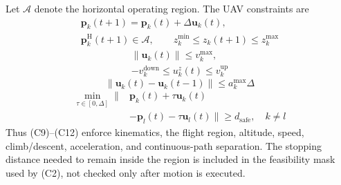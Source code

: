 Let $\mathcal A$ denote the horizontal operating region. The UAV constraints
are
\begin{equation}
\begin{gathered}
\boldsymbol p_k(t+1)=\boldsymbol p_k(t)+\Delta\boldsymbol u_k(t),\\
\boldsymbol p_k^{\mathrm H}(t+1)\in\mathcal A,\qquad
z_k^{\min}\le z_k(t+1)\le z_k^{\max}
\end{gathered}
\tag{C9}\label{con:position}
\end{equation}
\begin{equation}
\begin{gathered}
\|\boldsymbol u_k(t)\|\le v_k^{\max},\\
-v_k^{\mathrm{down}}\le u_k^z(t)\le v_k^{\mathrm{up}}
\end{gathered}
\tag{C10}\label{con:speed}
\end{equation}
\begin{equation}
\|\boldsymbol u_k(t)-\boldsymbol u_k(t-1)\|
\le a_k^{\max}\Delta
\tag{C11}\label{con:acceleration}
\end{equation}
\begin{equation}
\begin{aligned}
\min_{\tau\in[0,\Delta]}\|&\boldsymbol p_k(t)+\tau\boldsymbol u_k(t)\\
&-\boldsymbol p_l(t)-\tau\boldsymbol u_l(t)\|
\ge d_{\mathrm{safe}},\quad k\ne l
\end{aligned}
\tag{C12}\label{con:separation}
\end{equation}
Thus (C9)--(C12) enforce kinematics, the flight region, altitude, speed,
climb/descent, acceleration, and continuous-path separation. The stopping
distance needed to remain inside the region is included in the feasibility
mask used by (C2), not checked only after motion is executed.

